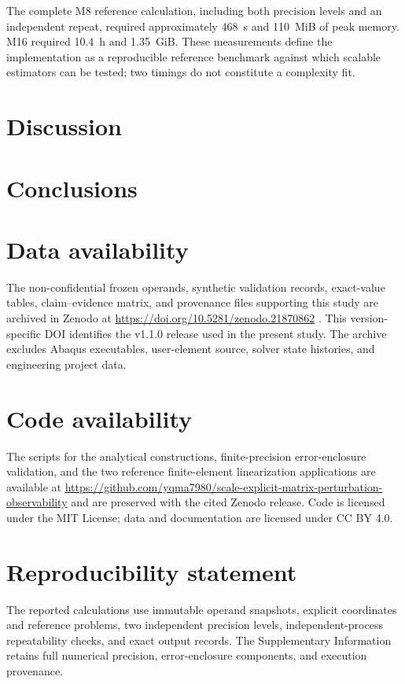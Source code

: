 \documentclass[preprint,12pt]{elsarticle}
\theoremstyle{definition}
\begin{document}
The complete M8 reference calculation, including both precision levels and an independent repeat, required approximately 468~s and 110~MiB of peak memory. M16 required 10.4~h and 1.35~GiB. These measurements define the implementation as a reproducible reference benchmark against which scalable estimators can be tested; two timings do not constitute a complexity fit.

\FloatBarrier
\section{Discussion}



\FloatBarrier

\section{Conclusions}



\section*{Data availability}
The non-confidential frozen operands, synthetic validation records, exact-value tables, claim--evidence matrix, and provenance files supporting this study are archived in Zenodo at \href{https://doi.org/10.5281/zenodo.21870862}{https://doi.org/10.5281/zenodo.21870862} \cite{liang2026artifact}. This version-specific DOI identifies the v1.1.0 release used in the present study. The archive excludes Abaqus executables, user-element source, solver state histories, and engineering project data.

\section*{Code availability}
The scripts for the analytical constructions, finite-precision error-enclosure validation, and the two reference finite-element linearization applications are available at \href{https://github.com/yqma7980/scale-explicit-matrix-perturbation-observability}{https://github.com/yqma7980/scale-explicit-matrix-perturbation-observability} and are preserved with the cited Zenodo release. Code is licensed under the MIT License; data and documentation are licensed under CC BY 4.0.

\section*{Reproducibility statement}
The reported calculations use immutable operand snapshots, explicit coordinates and reference problems, two independent precision levels, independent-process repeatability checks, and exact output records. The Supplementary Information retains full numerical precision, error-enclosure components, and execution provenance.
\end{document}
